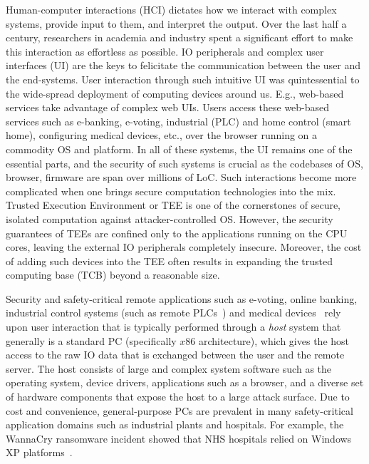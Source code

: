 
Human-computer interactions (HCI)  dictates how we interact with complex systems, provide input to them, and interpret the output. Over the last half a century, researchers in academia and industry spent a significant effort to make this interaction as effortless as possible. 
IO peripherals and complex user interfaces (UI) are the keys to felicitate the communication between the user and the end-systems. User interaction through such intuitive UI was quintessential to the wide-spread deployment of computing devices around us. E.g., web-based services take advantage of complex web UIs. Users access these web-based services such as e-banking, e-voting, industrial (PLC) and home control (smart home), configuring medical devices, etc., over the browser running on a commodity OS and platform. In all of these systems, the UI remains one of the essential parts, and the security of such systems is crucial as the codebases of OS, browser, firmware are span over millions of LoC. Such interactions become more complicated when one brings secure computation technologies into the mix. Trusted Execution Environment or TEE is one of the cornerstones of secure, isolated computation against attacker-controlled OS. However, the security guarantees of TEEs are confined only to the applications running on the CPU cores, leaving the external IO peripherals completely insecure. Moreover, the cost of adding such devices into the TEE often results in expanding the trusted computing base (TCB) beyond a reasonable size.

Security and safety-critical remote applications such as e-voting, online banking, industrial control systems (such as remote PLCs~\cite{controlbyweb}) and medical devices~\cite{medicalDevice} rely upon user interaction that is typically performed through a \emph{host} system that generally is a standard PC (specifically $x86$ architecture), which gives the host access to the raw IO data that is exchanged between the user and the remote server. The host consists of large and complex system software such as the operating system, device drivers, applications such as a browser, and a diverse set of hardware components that expose the host to a large attack surface. Due to cost and convenience, general-purpose PCs are prevalent in many safety-critical application domains such as industrial plants and hospitals. For example, the WannaCry ransomware incident showed that NHS hospitals relied on Windows XP platforms~\cite{berry_2017,field_wannacry_2018}. 


